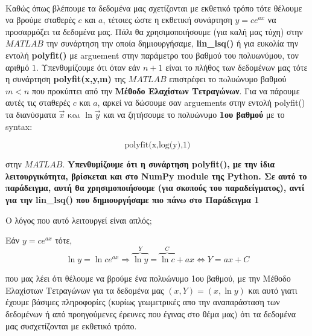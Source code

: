 \documentclass[12pt]{article}
\begin{document}
    \begin{center}
    \end{center}
    { \hspace*{\fill} \\}
    
    Καθώς όπως βλέπουμε τα δεδομένα μας σχετίζονται με εκθετικό τρόπο τότε
θέλουμε να βρούμε σταθερές \(c\) και \(a\), τέτοιες ώστε η εκθετική
συνάρτηση \(y=ce^{ax}\) να προσαρμόζει τα δεδομένα μας. Πάλι θα
χρησιμοποιήσουμε (για καλή μας τύχη) στην \(MATLAB\) την συνάρτηση την
οποία δημιουργήσαμε, \textbf{lin\_lsq()} ή για ευκολία την εντολή
\textbf{polyfit()} με arguement στην παράμετρο του βαθμού του
πολυωνύμου, τον αριθμό \(1\). Υπενθυμίζουμε ότι όταν εάν \(n+1\) είναι
το πλήθος των δεδομένων μας τότε η συνάρτηση \textbf{polyfit(x,y,m)} της
\(MATLAB\) επιστρέφει το πoλυώνυμο βαθμού \(m<n\) που προκύπτει από την
\textbf{Μέθοδο Ελαχίστων Τετραγώνων}. Για να πάρουμε αυτές τις σταθερές
\(c\) και \(a\), αρκεί να δώσουμε σαν arguements στην εντολή polyfit()
τα διανύσματα \(\vec{x} \text{ και } \ln{\vec{y}}\) και να ζητήσουμε το
πολυώνυμο \textbf{1ου βαθμού} με το syntax:

\[
\text{polyfit(x,log(y),1)} \nonumber
\]

στην \(MATLAB\). \textbf{Yπενθυμίζουμε ότι η συνάρτηση polyfit(), με την
ίδια λειτουργικότητα, βρίσκεται και στο NumPy module της Python. Σε αυτό
το παράδειγμα, αυτή θα χρησιμοποιήσουμε (για σκοπούς του παραδείγματος),
αντί για την lin\_lsq() που δημιουργήσαμε πιο πάνω στο Παράδειγμα 1}

Ο λόγος που αυτό λειτουργεί είναι απλός;

Εάν \(y=ce^{ax}\) τότε, \[
\ln{y} = \ln{ce^{ax}} \Rightarrow \overbrace{\ln{y}}^{Y} = \overbrace{\ln{c}}^{C} + ax \Leftrightarrow Y=ax+C \nonumber
\]

που μας λέει ότι θέλουμε να βρούμε ένα πολυώνυμο 1ου βαθμού, με την
Μέθοδο Ελαχίστων Τετραγώνων για τα δεδομένα μας \((x,Y)=(x,\ln{y})\) και
αυτό γιατι έχουμε βάσιμες πληροφορίες (κυρίως γεωμετρικές απο την
αναπαράσταση των δεδομένων ή από προηγούμενες έρευνες που έγινας στο
θέμα μας) ότι τα δεδομένα μας συσχετίζονται με εκθετικό τρόπο.
\end{document}
